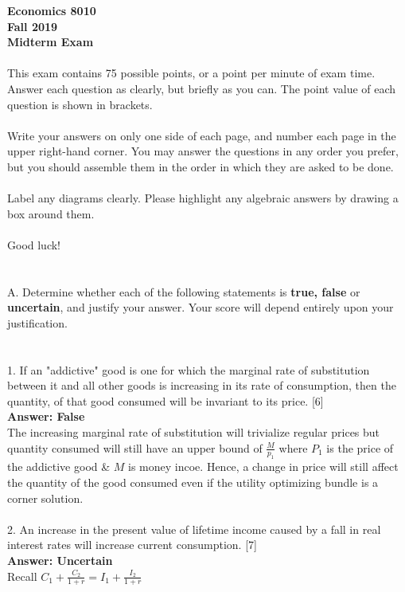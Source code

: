 \documentclass[11pt]{article}
\begin{document}
\noindent \textbf{Economics 8010}\\
\noindent \textbf{Fall 2019}\\
\noindent \textbf{Midterm Exam}\\
\\
This exam contains 75 possible points, or a point per minute of exam time. Answer each question as clearly, but briefly as you can. The point value of each question is shown in brackets.\\ 
\\
Write your answers on only one side of each page, and number each page in the upper right-hand corner. You may answer the questions in any order you prefer, but you should assemble them in the order in which they are asked to be done.\\
\\
Label any diagrams clearly. Please highlight any algebraic answers by drawing a box around them.\\
\\
Good luck!\\
\\
\\
A. Determine whether each of the following statements is \textbf{true, false} or \textbf{uncertain}, and justify your answer. Your score will depend entirely upon your justification.\\
\\
\\
1. If an "addictive" good is one for which the marginal rate of substitution between it and all other goods is increasing in its rate of consumption, then the quantity, of that good consumed will be invariant to its price. [6]\\
\textbf{Answer: False}\\
The increasing marginal rate of substitution will trivialize regular prices but quantity consumed will still have an upper bound of $\frac{M}{p_1}$ where $P_1$ is the price of the addictive good \& $M$ is money incoe. Hence, a change in price will still affect the quantity of the good consumed even if the utility optimizing bundle is a corner solution.\\
\\
2. An increase in the present value of lifetime income caused by a fall in real interest rates will increase current consumption. [7]\\
\textbf{Answer: Uncertain}\\
Recall $C_1 + \frac{C_2}{1+r} = I_1 + \frac{I_2}{1+r}$\\
\end{document}
